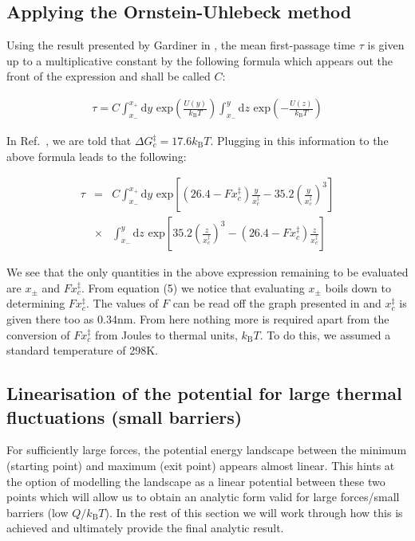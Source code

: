 \documentclass[twocolumn,pre,aps,showpacs,a4paper,floatfix,amssymb]{revtex4-1}
\begin{document}
\subsection{Applying the Ornstein-Uhlebeck method}
Using the result presented by Gardiner in \cite{gardiner2004handbook}, the mean first-passage time $\tau$ is given up to a multiplicative constant by the following formula which appears out the front of the expression and shall be called $C$:

\begin{eqnarray}
\tau = C\int_{x_-}^{x_+} \text{d}y \text{ exp}\left(\frac{U(y)}{k_\text{B}T}\right) \int_{x_-}^y \text{d}z \text{ exp}\left(-\frac{U(z)}{k_\text{B}T}\right)
\end{eqnarray}

In Ref.~\cite{dudko2006intrinsic}, we are told that $\Delta G_c^\ddagger = 17.6 k_\text{B}T$. Plugging in this information to the above formula leads to the following:

\begin{eqnarray}
\tau &=& C\int_{x_-}^{x_+} \text{d}y \text{ exp}\left[(26.4-Fx_c^\ddagger)\frac{y}{x_c^\ddagger} - 35.2\left(\frac{y}{x_c^\ddagger}\right)^3\right] \nonumber \\
&\times& \int_{x_-}^y \text{d}z \text{ exp}\left[35.2\left(\frac{z}{x_c^\ddagger}\right)^3 - (26.4-Fx_c^\ddagger)\frac{z}{x_c^\ddagger}\right]
\end{eqnarray}

\noindent We see that the only quantities in the above expression remaining to be evaluated are $x_\pm$ and $Fx_c^\ddagger$. From equation (5) we notice that evaluating $x_\pm$ boils down to determining $Fx_c^\ddagger$. The values of $F$ can be read off the graph presented in \cite{dudko2006intrinsic} and $x_c^\ddagger$ is given there too as 0.34nm. From here nothing more is required apart from the conversion of $Fx_c^\ddagger$ from Joules to thermal units, $k_\text{B}T$. To do this, we assumed a standard temperature of 298K.

\subsection{Linearisation of the potential for large thermal fluctuations (small barriers)}
For sufficiently large forces, the potential energy landscape between the minimum (starting point) and maximum (exit point) appears almost linear. This hints at the option of modelling the landscape as a linear potential between these two points which will allow us to obtain an analytic form valid for large forces/small barriers (low $Q/k_\text{B}T$). In the rest of this section we will work through how this is achieved and ultimately provide the final analytic result.
\end{document}
